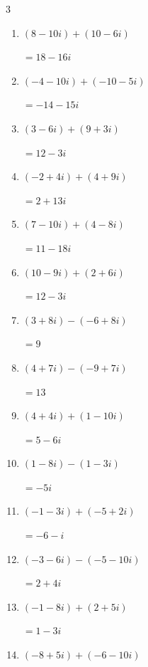 \begin{multicols}{3}
\begin{enumerate}
  \item $\displaystyle (8-10i) + (10-6i)$

        $\displaystyle =18-16i$

  \item $\displaystyle (-4-10i) + (-10-5i)$

        $\displaystyle =-14-15i$

  \item $\displaystyle (3-6i) + (9+3i)$

        $\displaystyle =12-3i$

  \item $\displaystyle (-2+4i) + (4+9i)$

        $\displaystyle =2+13i$

  \item $\displaystyle (7-10i) + (4-8i)$

        $\displaystyle =11-18i$

  \item $\displaystyle (10-9i) + (2+6i)$

        $\displaystyle =12-3i$

  \item $\displaystyle (3+8i) - (-6+8i)$

        $\displaystyle =9$

  \item $\displaystyle (4+7i) - (-9+7i)$

        $\displaystyle =13$

  \item $\displaystyle (4+4i) + (1-10i)$

        $\displaystyle =5-6i$

  \item $\displaystyle (1-8i) - (1-3i)$

        $\displaystyle =-5i$

  \item $\displaystyle (-1-3i) + (-5+2i)$

        $\displaystyle =-6-i$

  \item $\displaystyle (-3-6i) - (-5-10i)$

        $\displaystyle =2+4i$

  \item $\displaystyle (-1-8i) + (2+5i)$

        $\displaystyle =1-3i$

  \item $\displaystyle (-8+5i) + (-6-10i)$


\end{enumerate}
\end{multicols}
